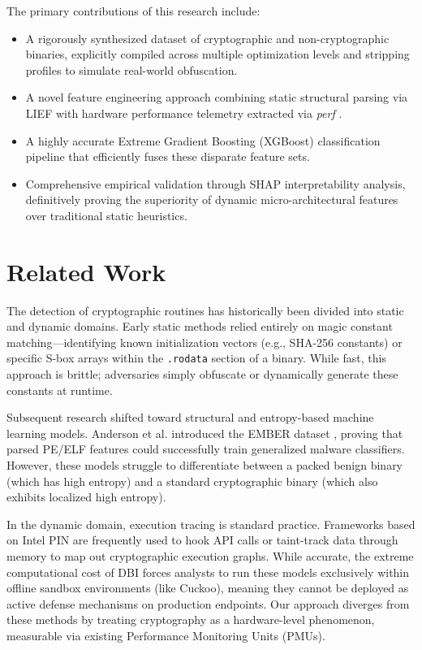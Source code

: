\documentclass[conference]{IEEEtran}
\begin{document}
The primary contributions of this research include:
\begin{itemize}
    \item A rigorously synthesized dataset of cryptographic and non-cryptographic binaries, explicitly compiled across multiple optimization levels and stripping profiles to simulate real-world obfuscation.
    \item A novel feature engineering approach combining static structural parsing via LIEF \cite{lief} with hardware performance telemetry extracted via \textit{perf} \cite{weaver2013papi}.
    \item A highly accurate Extreme Gradient Boosting (XGBoost) \cite{chen2016xgboost} classification pipeline that efficiently fuses these disparate feature sets.
    \item Comprehensive empirical validation through SHAP \cite{lundberg2017shap} interpretability analysis, definitively proving the superiority of dynamic micro-architectural features over traditional static heuristics.
\end{itemize}

\section{Related Work}
The detection of cryptographic routines has historically been divided into static and dynamic domains. Early static methods relied entirely on magic constant matching---identifying known initialization vectors (e.g., SHA-256 constants) or specific S-box arrays within the \texttt{.rodata} section of a binary. While fast, this approach is brittle; adversaries simply obfuscate or dynamically generate these constants at runtime.

Subsequent research shifted toward structural and entropy-based machine learning models. Anderson et al. introduced the EMBER dataset \cite{anderson2018ember}, proving that parsed PE/ELF features could successfully train generalized malware classifiers. However, these models struggle to differentiate between a packed benign binary (which has high entropy) and a standard cryptographic binary (which also exhibits localized high entropy).

In the dynamic domain, execution tracing is standard practice. Frameworks based on Intel PIN \cite{luk2005pin} are frequently used to hook API calls or taint-track data through memory to map out cryptographic execution graphs. While accurate, the extreme computational cost of DBI forces analysts to run these models exclusively within offline sandbox environments (like Cuckoo), meaning they cannot be deployed as active defense mechanisms on production endpoints. Our approach diverges from these methods by treating cryptography as a hardware-level phenomenon, measurable via existing Performance Monitoring Units (PMUs).
\end{document}
